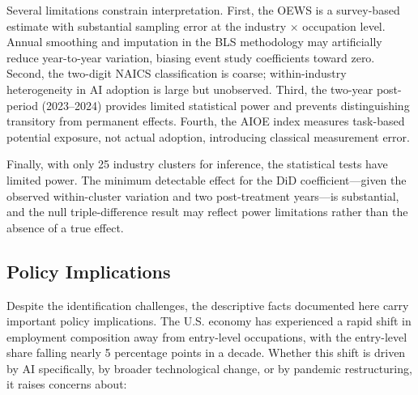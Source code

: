 \documentclass[12pt]{article}
\begin{document}
Several limitations constrain interpretation. First, the OEWS is a survey-based estimate with substantial sampling error at the industry $\times$ occupation level. Annual smoothing and imputation in the BLS methodology may artificially reduce year-to-year variation, biasing event study coefficients toward zero. Second, the two-digit NAICS classification is coarse; within-industry heterogeneity in AI adoption is large but unobserved. Third, the two-year post-period (2023--2024) provides limited statistical power and prevents distinguishing transitory from permanent effects. Fourth, the AIOE index measures task-based potential exposure, not actual adoption, introducing classical measurement error.

Finally, with only 25 industry clusters for inference, the statistical tests have limited power. The minimum detectable effect for the DiD coefficient---given the observed within-cluster variation and two post-treatment years---is substantial, and the null triple-difference result may reflect power limitations rather than the absence of a true effect.

\subsection{Policy Implications}

Despite the identification challenges, the descriptive facts documented here carry important policy implications. The U.S. economy has experienced a rapid shift in employment composition away from entry-level occupations, with the entry-level share falling nearly 5 percentage points in a decade. Whether this shift is driven by AI specifically, by broader technological change, or by pandemic restructuring, it raises concerns about:
\end{document}
